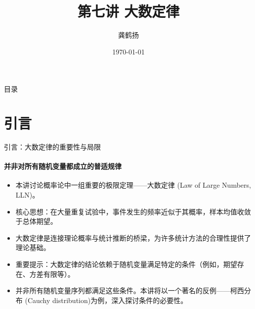 \documentclass[UTF8]{beamer}
\title{第七讲 大数定律}
\author{龚鹤扬}
\institute{中国科学技术大学统计学博士 \\ 上海芯梯科技有限公司} %
\date{\today}
\begin{document}
\begin{frame}
    \titlepage
\end{frame}

\begin{frame}{目录}
    \tableofcontents
\end{frame}

\section{引言}
\begin{frame}[shrink=10]{引言：大数定律的重要性与局限}
    \framesubtitle{并非对所有随机变量都成立的普适规律}
    \begin{itemize}
        \item 本讲讨论概率论中一组重要的极限定理——\alert{大数定律 (Law of Large Numbers, LLN)}。
        \item 核心思想：在大量重复试验中，事件发生的\alert{频率}近似于其\alert{概率}，样本均值收敛于总体\alert{期望}。
        \item 大数定律是连接\alert{理论概率}与\alert{统计推断}的桥梁，为许多统计方法的合理性提供了理论基础。
        \item \alert{重要提示}：大数定律的结论依赖于随机变量满足特定的\alert{条件}（例如，期望存在、方差有限等）。
        \item 并非所有随机变量序列都满足这些条件。本讲将以一个著名的反例——\alert{柯西分布 (Cauchy distribution)}为例，深入探讨条件的必要性。
    \end{itemize}
\end{frame}
\end{document}
